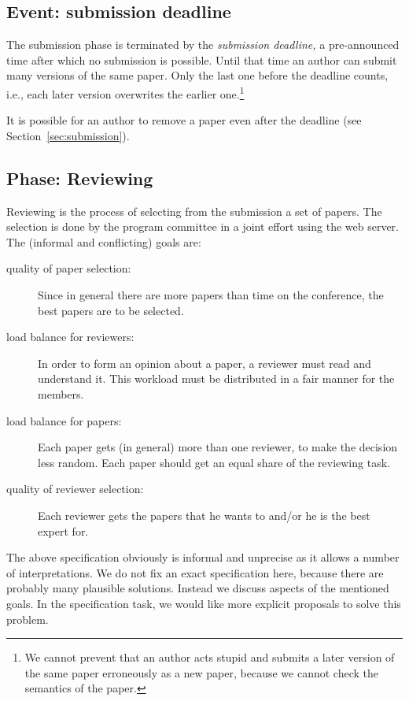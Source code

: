 \subsection{Event: submission deadline}
\label{sec:deadline}

The submission phase is terminated by the \emph{submission deadline,} a
pre-announced time after which no submission is possible. Until that time
an author can submit many versions of the same paper. Only the last one
before the deadline counts, i.e., each later version overwrites the earlier
one.\footnote{We cannot prevent that an author acts stupid and submits a
  later version of the same paper erroneously as a new paper, because we
  cannot check the semantics of the paper.}

It is possible for an author to remove a paper even after the deadline (see
Section~\ref{sec:submission}).



\subsection{Phase: Reviewing}
\label{sec:reviewing}

Reviewing is the process of selecting from the submission a set of papers.
The selection is done by the program committee in a joint effort using the
web server. The (informal and conflicting) goals are:
\begin{description}
\item[quality of paper selection:] Since in general there are more papers
  than time on the conference, the best papers are to be selected.
\item[load balance for reviewers:] In order to form an opinion about a
  paper, a reviewer must read and understand it.  This workload must be
  distributed in a fair manner for the members.
\item[load balance for papers:] Each paper gets (in general) more than one
  reviewer, to make the decision less random. Each paper should get an
  equal share of the reviewing task.
\item[quality of reviewer selection:] Each reviewer gets the papers that he
  wants to and/or he is the best expert for.
\end{description}

The above specification obviously is informal and unprecise as it allows a
number of interpretations. We do not fix an exact specification here,
because there are probably many plausible solutions.  Instead we discuss
aspects of the mentioned goals. In the specification task, we would like
more explicit proposals to solve this problem.

